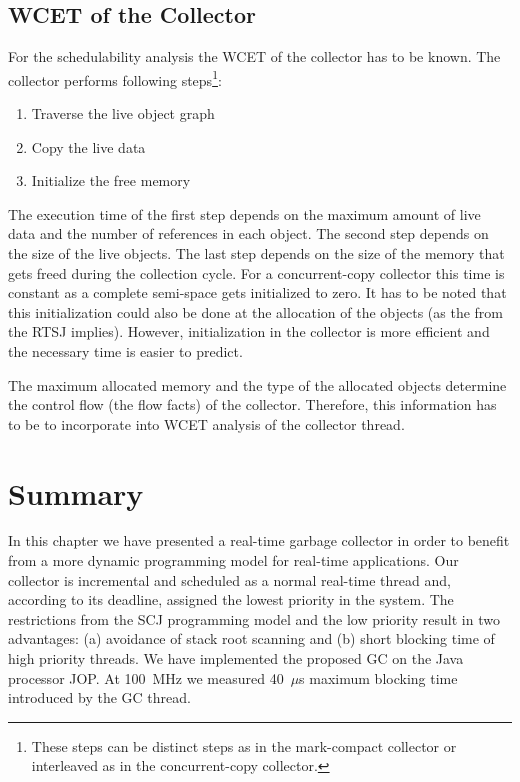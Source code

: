 \subsection{WCET of the Collector}

For the schedulability analysis the WCET of the collector has to be
known. The collector performs following steps\footnote{These steps
can be distinct steps as in the mark-compact collector or
interleaved as in the concurrent-copy collector.}:
\begin{enumerate}
    \item Traverse the live object graph
    \item Copy the live data
    \item Initialize the free memory
\end{enumerate}

The execution time of the first step depends on the maximum amount
of live data and the number of references in each object. The second
step depends on the size of the live objects. The last step depends
on the size of the memory that gets freed during the collection
cycle. For a concurrent-copy collector this time is constant as a
complete semi-space gets initialized to zero. It has to be noted
that this initialization could also be done at the allocation of the
objects (as the  from the RTSJ implies). However,
initialization in the collector is more efficient and the necessary
time is easier to predict.

The maximum allocated memory and the type of the allocated objects
determine the control flow (the flow facts) of the collector.
Therefore, this information has to be to incorporate into WCET
analysis of the collector thread.

\section{Summary} \label{sec:gc:summery}

In this chapter we have presented a real-time garbage collector in
order to benefit from a more dynamic programming model for real-time
applications. Our collector is incremental and scheduled as a normal
real-time thread and, according to its deadline, assigned the lowest
priority in the system. The restrictions from the SCJ programming
model and the low priority result in two advantages: (a) avoidance of
stack root scanning and (b) short blocking time of high priority
threads. We have implemented the proposed GC on the Java processor
JOP. At 100~MHz we measured 40~$\mu$s maximum blocking time
introduced by the GC thread.


